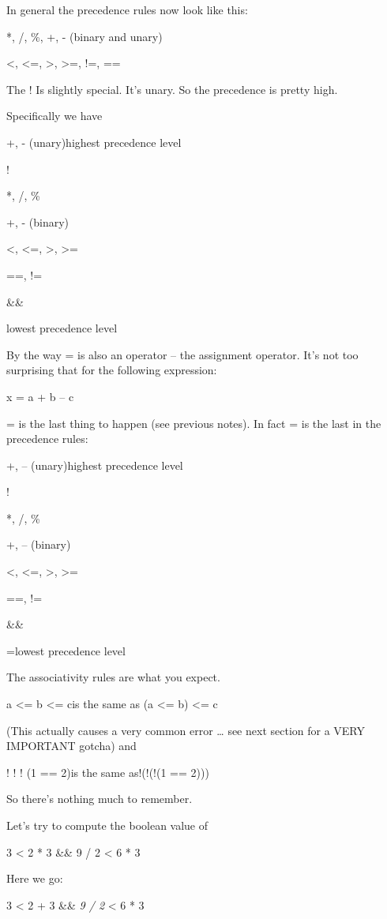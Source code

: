 \documentclass[
]{article}
\begin{document}
In general the precedence rules now look like this:

*, /, \%, +, - (binary and unary)

\textless, \textless=, \textgreater, \textgreater=, !=, ==

The ! Is slightly special. It's unary. So the precedence is pretty high.

Specifically we have

+, - (unary)highest precedence level

!

*, /, \%

+, - (binary)

\textless, \textless=, \textgreater, \textgreater=

==, !=

\&\&

\textbar\textbar lowest precedence level

By the way = is also an operator -- the assignment operator. It's not
too surprising that for the following expression:

x = a + b -- c

= is the last thing to happen (see previous notes). In fact = is the
last in the precedence rules:

+, -- (unary)highest precedence level

!

*, /, \%

+, -- (binary)

\textless, \textless=, \textgreater, \textgreater=

==, !=

\&\&

\textbar\textbar{}

=lowest precedence level

The associativity rules are what you expect.

a \textless= b \textless= cis the same as (a \textless= b) \textless= c

(This actually causes a very common error \ldots{} see next section for
a VERY IMPORTANT gotcha) and

! ! ! (1 == 2)is the same as!(!(!(1 == 2)))

So there's nothing much to remember.

Let's try to compute the boolean value of

3 \textless{} 2 * 3 \&\& 9 / 2 \textless{} 6 * 3

Here we go:

3 \textless{} 2 + 3 \&\& \emph{9 / 2} \textless{} 6 * 3
\end{document}
